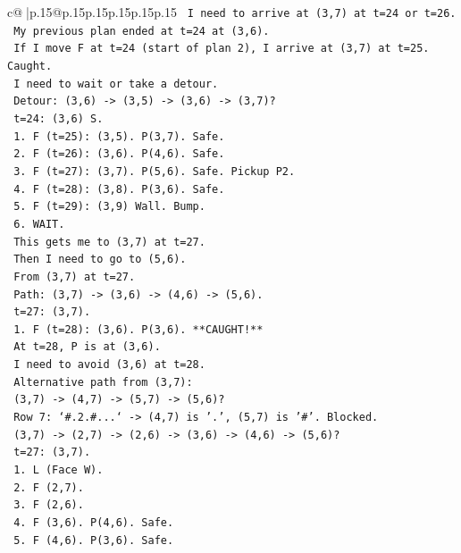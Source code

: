 \documentclass{article}
\begin{document}
{\begin{supertabular}{c@{$\;$}|p{.15\linewidth}@{}p{.15\linewidth}p{.15\linewidth}p{.15\linewidth}p{.15\linewidth}p{.15\linewidth}}
{{{\texttt{   I need to arrive at (3,7) at t=24 or t=26.} \\
\texttt{   My previous plan ended at t=24 at (3,6).} \\
\texttt{   If I move F at t=24 (start of plan 2), I arrive at (3,7) at t=25. Caught.} \\
\texttt{   I need to wait or take a detour.} \\
\texttt{   Detour: (3,6) {-}> (3,5) {-}> (3,6) {-}> (3,7)?} \\
\texttt{   t=24: (3,6) S.} \\
\texttt{   1. F (t=25): (3,5). P(3,7). Safe.} \\
\texttt{   2. F (t=26): (3,6). P(4,6). Safe.} \\
\texttt{   3. F (t=27): (3,7). P(5,6). Safe. Pickup P2.} \\
\texttt{   4. F (t=28): (3,8). P(3,6). Safe.} \\
\texttt{   5. F (t=29): (3,9) Wall. Bump.} \\
\texttt{   6. WAIT.} \\
\texttt{   This gets me to (3,7) at t=27.} \\
\texttt{   Then I need to go to (5,6).} \\
\texttt{   From (3,7) at t=27.} \\
\texttt{   Path: (3,7) {-}> (3,6) {-}> (4,6) {-}> (5,6).} \\
\texttt{   t=27: (3,7).} \\
\texttt{   1. F (t=28): (3,6). P(3,6). **CAUGHT!**} \\
\texttt{   At t=28, P is at (3,6).} \\
\texttt{   I need to avoid (3,6) at t=28.} \\
\texttt{   Alternative path from (3,7):} \\
\texttt{   (3,7) {-}> (4,7) {-}> (5,7) {-}> (5,6)?} \\
\texttt{   Row 7: `\#.2.\#...` {-}> (4,7) is '.', (5,7) is '\#'. Blocked.} \\
\texttt{   (3,7) {-}> (2,7) {-}> (2,6) {-}> (3,6) {-}> (4,6) {-}> (5,6)?} \\
\texttt{   t=27: (3,7).} \\
\texttt{   1. L (Face W).} \\
\texttt{   2. F (2,7).} \\
\texttt{   3. F (2,6).} \\
\texttt{   4. F (3,6). P(4,6). Safe.} \\
\texttt{   5. F (4,6). P(3,6). Safe.} \\
}}}
\end{supertabular}}
\end{document}
